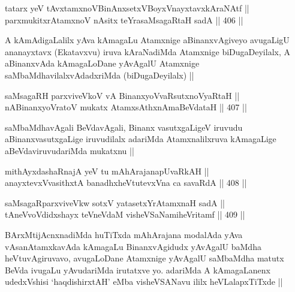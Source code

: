 
\begin{shl}
tatarx yeV tAvxtamxnoV\s BinAnxsetxVBoyxV\s nayxtavxkAraNAtf ||  \\
parxmukitxrAtamxnoV nAsitx teYrasaMsagaRtaH sadA ||  406 ||  
\end{shl}

\begin{artha}
A kAmAdigaLalilx yAva kAmagaLu Atamxnige aBinanxvAgiveyo avugaLigU
ananayxtavx (Ekatavxvu) iruva kAraNadiMda Atamxnige biDugaDeyilalx, A
aBinanxvAda kAmagaLoDane yAvAgalU Atamxnige saMbaMdhavilalxvAdadxriMda
(biDugaDeyilalx) ||
\end{artha}


\begin{shl}
saMsagaRH parxviveVkoV vA BinanxyoVvaRsutxnoVyaRtaH || \\
nABinanxyoVratoV mukatx AtamxsAthxnAmaBeVdataH ||  407 ||  
\end{shl}

\begin{artha}
saMbaMdhavAgali BeVdavAgali, Binanx vasutxgaLigeV iruvudu
aBinanxvasutxgaLige iruvudilalx adariMda Atamxnalilxruva kAmagaLige
aBeVdaviruvudariMda mukatxnu ||
\end{artha}


\begin{shl}
mithAyxdashaRnajA yeV tu mAhArajanapUvaRkAH || \\
anayxtevxV\s vasithxtA banadhxheVtutevxVna ca savaRdA ||  408 ||  
\end{shl}
				
\begin{shl}
saMsagaRparxviveVkw sotxV yatasetxYrAtamxnaH sadA || \\
tAneVvoVdidxshayx teVneVdaM visheVSaNamiheVritamf ||  409 ||  
\end{shl}

\begin{artha}
BArxMtijAcnxnadiMda huTiTxda mAhArajana modalAda yAva vAsanAtamxkavAda
kAmagaLu BinanxvAgidudx yAvAgalU baMdha heVtuvAgiruvavo, avugaLoDane
Atamxnige yAvAgalU saMbaMdha matutx BeVda ivugaLu yAvudariMda
irutatxve yo. adariMda  A kAmagaLanenx udedxVshisi `haqdishirxtAH'
eMba visheVSANavu ililx heVLalapxTiTxde ||
\end{artha}

